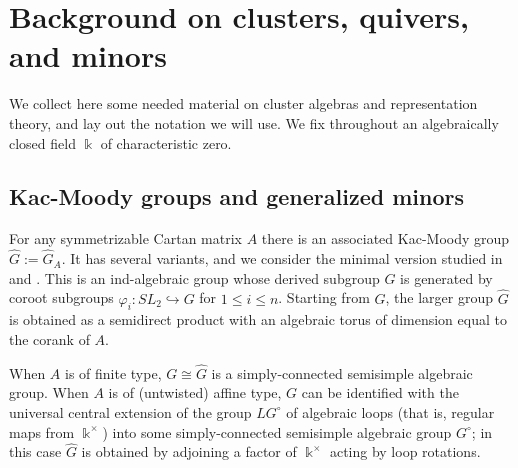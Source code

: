 \documentclass[12pt]{amsart}
\newcommand{\kk}{\Bbbk}
\newcommand\into{\hookrightarrow}
\theoremstyle{remark}
\numberwithin{equation}{section}
\numberwithin{figure}{section}
\begin{document}
\section{Background on clusters, quivers, and minors}

We collect here some needed material on cluster algebras and representation theory, and lay out the notation we will use.
We fix throughout an algebraically closed field $\kk$ of characteristic zero.

\subsection{Kac-Moody groups and generalized minors}\label{sec:group background}

For any symmetrizable Cartan matrix $A$ there is an associated Kac-Moody group $\widehat{G}:=\widehat{G}_A$.
It has several variants, and we consider the minimal version studied in \cite{KP83} and \cite[Section 7.4]{Kum02}.
This is an ind-algebraic group whose derived subgroup $G$ is generated by coroot subgroups $\varphi_i: SL_2 \into G$ for $1 \leq i \leq n$.
Starting from $G$, the larger group $\widehat{G}$ is obtained as a semidirect product with an algebraic torus of dimension equal to the corank of $A$.

When $A$ is of finite type, $G \cong \widehat{G}$ is a simply-connected semisimple algebraic group.
When $A$ is of (untwisted) affine type, $G$ can be identified with the universal central extension of the group $LG^\circ$ of algebraic loops (that is, regular maps from $\kk^\times$) into some simply-connected semisimple algebraic group $G^\circ$; in this case $\widehat{G}$ is obtained by adjoining a factor of $\kk^\times$ acting by loop rotations.
\end{document}
